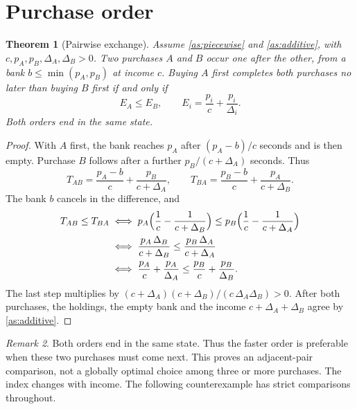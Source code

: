 \documentclass[11pt,a4paper]{article}
\numberwithin{equation}{section}
\newtheorem{theorem}{Theorem}[section]
\theoremstyle{definition}
\theoremstyle{remark}
\newtheorem{remark}[theorem]{Remark}
\begin{document}
\section{Purchase order}\label{sec:purchase}
\begin{theorem}[Pairwise exchange]\label{thm:exchange}
Assume \ref{as:piecewise} and \ref{as:additive}, with $c,p_A,p_B,\Delta_A,\Delta_B>0$. Two purchases $A$ and $B$ occur one after the other, from a bank $b\le\min(p_A,p_B)$ at income $c$. Buying $A$ first completes both purchases no later than buying $B$ first if and only if
\begin{equation}\label{eq:index}
 E_A\le E_B,\qquad E_i=\frac{p_i}c+\frac{p_i}{\Delta_i}.
\end{equation}
Both orders end in the same state.
\end{theorem}

\begin{proof}
With $A$ first, the bank reaches $p_A$ after $(p_A-b)/c$ seconds and is then empty. Purchase $B$ follows after a further $p_B/(c+\Delta_A)$ seconds. Thus
\[
 T_{AB}=\frac{p_A-b}c+\frac{p_B}{c+\Delta_A},\qquad T_{BA}=\frac{p_B-b}c+\frac{p_A}{c+\Delta_B}.
\]
The bank $b$ cancels in the difference, and
\begin{align*}
 T_{AB}\le T_{BA}
 &\iff p_A\Bigl(\frac1c-\frac1{c+\Delta_B}\Bigr)\le p_B\Bigl(\frac1c-\frac1{c+\Delta_A}\Bigr)\\
 &\iff \frac{p_A\,\Delta_B}{c+\Delta_B}\le\frac{p_B\,\Delta_A}{c+\Delta_A}\\
 &\iff \frac{p_A}c+\frac{p_A}{\Delta_A}\le\frac{p_B}c+\frac{p_B}{\Delta_B}.
\end{align*}
The last step multiplies by $(c+\Delta_A)(c+\Delta_B)/(c\,\Delta_A\Delta_B)>0$. After both purchases, the holdings, the empty bank and the income $c+\Delta_A+\Delta_B$ agree by \ref{as:additive}.
\end{proof}

\begin{remark}\label{rem:local}
Both orders end in the same state. Thus the faster order is preferable when these two purchases must come next. This proves an adjacent-pair comparison, not a globally optimal choice among three or more purchases. The index changes with income. The following counterexample has strict comparisons throughout.
\end{remark}
\end{document}
